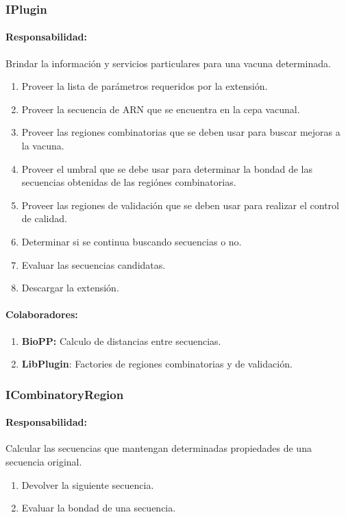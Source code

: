   \subsubsection{IPlugin}
    \paragraph{Responsabilidad:} Brindar la informaci\'on y servicios
particulares para una vacuna determinada.    
      \begin{enumerate}
       \item Proveer la lista de par\'ametros requeridos por la extensi\'on.
       \item Proveer la secuencia de ARN que se encuentra en la cepa vacunal.
       \item Proveer las regiones combinatorias que se deben usar para buscar
mejoras a la vacuna.
       \item Proveer el umbral que se debe usar para determinar la bondad de las
secuencias obtenidas de las regi\'ones combinatorias.
       \item Proveer las regiones de validaci\'on que se deben usar para
realizar el control de calidad.
       \item Determinar si se continua buscando secuencias o no.
       \item Evaluar las secuencias candidatas.
       \item Descargar la extensi\'on.
      \end{enumerate}
    \paragraph{Colaboradores:}
      \begin{enumerate}
       \item \textbf{BioPP:} Calculo de distancias entre secuencias.
       \item \textbf{LibPlugin}: Factories de regiones combinatorias y de
validaci\'on.
      \end{enumerate}

  \subsubsection{ICombinatoryRegion}
    \paragraph{Responsabilidad:} Calcular las secuencias que mantengan
determinadas propiedades de una secuencia original.    
      \begin{enumerate}
       \item Devolver la siguiente secuencia.
       \item Evaluar la bondad de una secuencia.
      \end{enumerate}
